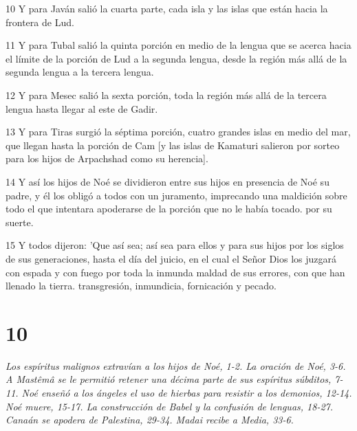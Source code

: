 \par 10 Y para Javán salió la cuarta parte, cada isla y las islas que están hacia la frontera de Lud.
\par 11 Y para Tubal salió la quinta porción en medio de la lengua que se acerca hacia el límite de la porción de Lud a la segunda lengua, desde la región más allá de la segunda lengua a la tercera lengua.
\par 12 Y para Mesec salió la sexta porción, toda la región más allá de la tercera lengua hasta llegar al este de Gadir.
\par 13 Y para Tiras surgió la séptima porción, cuatro grandes islas en medio del mar, que llegan hasta la porción de Cam [y las islas de Kamaturi salieron por sorteo para los hijos de Arpachshad como su herencia].
\par 14 Y así los hijos de Noé se dividieron entre sus hijos en presencia de Noé su padre, y él los obligó a todos con un juramento, imprecando una maldición sobre todo el que intentara apoderarse de la porción que no le había tocado. por su suerte.
\par 15 Y todos dijeron: 'Que así sea; así sea para ellos y para sus hijos por los siglos de sus generaciones, hasta el día del juicio, en el cual el Señor Dios los juzgará con espada y con fuego por toda la inmunda maldad de sus errores, con que han llenado la tierra. transgresión, inmundicia, fornicación y pecado.

\chapter{10}

\par \textit{Los espíritus malignos extravían a los hijos de Noé, 1-2. La oración de Noé, 3-6. A Mastêmâ se le permitió retener una décima parte de sus espíritus súbditos, 7-11. Noé enseñó a los ángeles el uso de hierbas para resistir a los demonios, 12-14. Noé muere, 15-17. La construcción de Babel y la confusión de lenguas, 18-27. Canaán se apodera de Palestina, 29-34. Madai recibe a Media, 33-6.}

